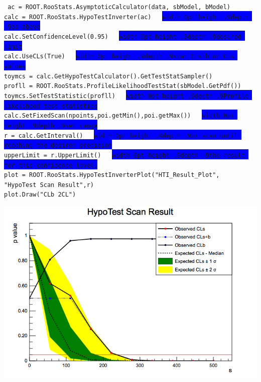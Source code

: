\documentclass[landscape,a1paper,fontscale=0.5]{baposter} %
\newcommand{\reducedstrut}{\vrule width 0pt height .9\ht\strutbox depth .9\dp\strutbox\relax}
\newcommand{\cmt}[1]{%
  \begingroup
  \setlength{\fboxsep}{0pt}%
  \color{white}
  \textnormal{
  \colorbox{blue}{\reducedstrut#1\/}}%
  \endgroup
}
\begin{document}
\begin{poster}
{\begin{tcolorbox}[colback=blue!5!white,colframe=blue!75!black,width=\linewidth,title=Limits using Hypothesis Test Inversion (CLs Limits)]
\tt{
ac = ROOT.RooStats.AsymptoticCalculator(data, sbModel, bModel)\\
calc = ROOT.RooStats.HypoTestInverter(ac) \hfill\cmt{as above}\\
calc.SetConfidenceLevel(0.95) \hfill\cmt{desired limit}\\
calc.UseCLs(True)\hfill\cmt{scan CLs+b or CLs values}\\
toymcs = calc.GetHypoTestCalculator().GetTestStatSampler()\\
profll = ROOT.RooStats.ProfileLikelihoodTestStat(sbModel.GetPdf())\\
toymcs.SetTestStatistic(profll)\hfill\cmt{Profile likelihood test statistics}\\
calc.SetFixedScan(npoints,poi.getMin(),poi.getMax())\hfill\cmt{set range}\\
r = calc.GetInterval()\hfill\cmt{or scan until reaching the desired precision}\\
upperLimit = r.UpperLimit()\hfill\cmt{the result for this confidence level.}\\
plot = ROOT.RooStats.HypoTestInverterPlot("HTI\_Result\_Plot",\\
\hspace*{7cm}"HypoTest Scan Result",r)\\
plot.Draw("CLb 2CL")
}
\begin{center}\includegraphics[width=0.5\linewidth]{cls}\end{center}

\end{tcolorbox}

}




\end{poster}
\end{document}
